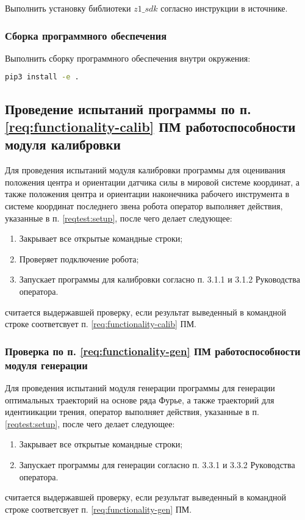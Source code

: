 Выполнить установку библиотеки $z1\_sdk$ согласно инструкции в источнике.

\subsubsection{Сборка программного обеспечения}

Выполнить сборку программного обеспечения внутри окружения:
\begin{lstlisting}[language=bash, numbers=none, frame=single]
    pip3 install -e .
\end{lstlisting}

\subsection{Проведение испытаний программы \productname по п. \ref{req:functionality-calib} ПМ работоспособности модуля калибровки} \label{reqtest:functionality-calib}
Для проведения испытаний модуля калибровки программы \productname для оценивания положения центра и ориентации датчика силы в мировой системе координат, а также положения центра и ориентации наконечника рабочего инструмента в системе координат последнего звена робота оператор выполняет действия, указанные в п. \ref{reqtest:setup}, после чего делает следующее:
\begin{enumerate}
    \item Закрывает все открытые командные строки;
    \item Проверяет подключение робота;
    \item Запускает программы для калибровки согласно п. 3.1.1 и 3.1.2 Руководства оператора.
\end{enumerate}
 \programname считается выдержавшей проверку, если результат выведенный в командной строке соответсвует п. \ref{req:functionality-calib} ПМ.


\subsubsection{Проверка по п. \ref{req:functionality-gen} ПМ работоспособности модуля генерации} \label{reqtest:functionality-gen}

Для проведения испытаний модуля генерации программы \productname для генерации оптимальных траекторий на основе ряда Фурье, а также траекторий для идентиикации трения, оператор выполняет действия, указанные в п. \ref{reqtest:setup}, после чего делает следующее:
\begin{enumerate}
    \item Закрывает все открытые командные строки;
    \item Запускает программы для генерации согласно п. 3.3.1 и 3.3.2 Руководства оператора.
\end{enumerate}
\programname считается выдержавшей проверку, если результат выведенный в командной строке соответсвует п. \ref{req:functionality-gen} ПМ.

